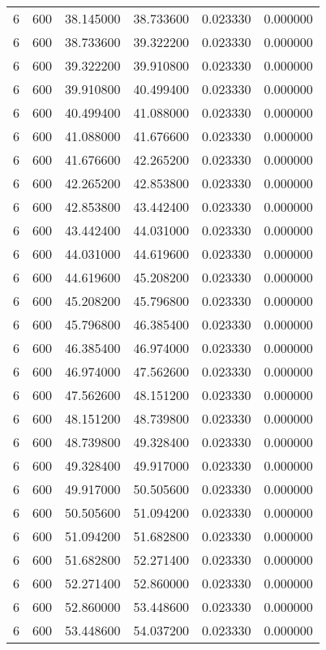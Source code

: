 \begin{longtable}{rrrrrr}
6 & 600 & 38.145000 & 38.733600 & 0.023330 & 0.000000 \\
6 & 600 & 38.733600 & 39.322200 & 0.023330 & 0.000000 \\
6 & 600 & 39.322200 & 39.910800 & 0.023330 & 0.000000 \\
6 & 600 & 39.910800 & 40.499400 & 0.023330 & 0.000000 \\
6 & 600 & 40.499400 & 41.088000 & 0.023330 & 0.000000 \\
6 & 600 & 41.088000 & 41.676600 & 0.023330 & 0.000000 \\
6 & 600 & 41.676600 & 42.265200 & 0.023330 & 0.000000 \\
6 & 600 & 42.265200 & 42.853800 & 0.023330 & 0.000000 \\
6 & 600 & 42.853800 & 43.442400 & 0.023330 & 0.000000 \\
6 & 600 & 43.442400 & 44.031000 & 0.023330 & 0.000000 \\
6 & 600 & 44.031000 & 44.619600 & 0.023330 & 0.000000 \\
6 & 600 & 44.619600 & 45.208200 & 0.023330 & 0.000000 \\
6 & 600 & 45.208200 & 45.796800 & 0.023330 & 0.000000 \\
6 & 600 & 45.796800 & 46.385400 & 0.023330 & 0.000000 \\
6 & 600 & 46.385400 & 46.974000 & 0.023330 & 0.000000 \\
6 & 600 & 46.974000 & 47.562600 & 0.023330 & 0.000000 \\
6 & 600 & 47.562600 & 48.151200 & 0.023330 & 0.000000 \\
6 & 600 & 48.151200 & 48.739800 & 0.023330 & 0.000000 \\
6 & 600 & 48.739800 & 49.328400 & 0.023330 & 0.000000 \\
6 & 600 & 49.328400 & 49.917000 & 0.023330 & 0.000000 \\
6 & 600 & 49.917000 & 50.505600 & 0.023330 & 0.000000 \\
6 & 600 & 50.505600 & 51.094200 & 0.023330 & 0.000000 \\
6 & 600 & 51.094200 & 51.682800 & 0.023330 & 0.000000 \\
6 & 600 & 51.682800 & 52.271400 & 0.023330 & 0.000000 \\
6 & 600 & 52.271400 & 52.860000 & 0.023330 & 0.000000 \\
6 & 600 & 52.860000 & 53.448600 & 0.023330 & 0.000000 \\
6 & 600 & 53.448600 & 54.037200 & 0.023330 & 0.000000 \\

\end{longtable}
